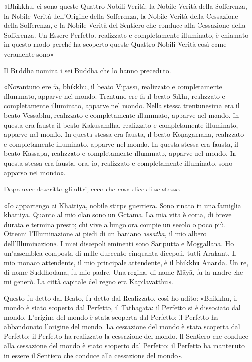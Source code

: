 
«Bhikkhu, ci sono queste Quattro Nobili Verità: la Nobile Verità della
Sofferenza, la Nobile Verità dell’Origine della Sofferenza, la Nobile Verità
della Cessazione della Sofferenza, e la Nobile Verità del Sentiero che conduce
alla Cessazione della Sofferenza. Un Essere Perfetto, realizzato e completamente
illuminato, è chiamato in questo modo perché ha scoperto queste Quattro Nobili
Verità così come veramente sono».


 Il Buddha nomina i sei Buddha che lo hanno preceduto.

 «Novantuno ere fa, bhikkhu, il beato Vipassī, realizzato e
completamente illuminato, apparve nel mondo. Trentuno ere fa il beato Sikhī,
realizzato e completamente illuminato, apparve nel mondo. Nella stessa
trentunesima era il beato Vessabhū, realizzato e completamente illuminato,
apparve nel mondo. In questa era fausta il beato Kakusandha, realizzato e
completamente illuminato, apparve nel mondo. In questa stessa era fausta, il
beato Koṇāgamana, realizzato e completamente illuminato, apparve nel mondo. In
questa stessa era fausta, il beato Kassapa, realizzato e completamente
illuminato, apparve nel mondo. In questa stessa era fausta, ora, io, realizzato
e completamente illuminato, sono apparso nel mondo».


 Dopo aver descritto gli altri, ecco che cosa dice di
se stesso.

 «Io appartengo ai Khattiya, nobile stirpe guerriera. Sono
rinato in una famiglia khattiya. Quanto al mio clan sono un Gotama. La mia vita
è corta, di breve durata e termina presto; chi vive a lungo ora compie un secolo
o poco più. Ottenni l’Illuminazione ai piedi di un baniano \emph{assatha}, il
mio albero dell’Illuminazione. I miei discepoli eminenti sono Sāriputta e
Moggallāna. Ho un’assemblea composta di mille duecento cinquanta dicepoli, tutti
Arahant. Il mio monaco attendente, il mio principale attendente, è il bhikkhu
Ānanda. Un re, di nome Suddhodana, fu mio padre. Una regina, di nome Māyā, fu la
madre che mi generò. La città capitale del regno era Kapilavatthu».


Questo fu detto dal Beato, fu detto dal Realizzato, così ho udito: «Bhikkhu, il
mondo è stato scoperto dal Perfetto, il Tathāgata: il Perfetto si è dissociato
dal mondo. L’origine del mondo è stata scoperta dal Perfetto: il Perfetto ha
abbandonato l’origine del mondo. La cessazione del mondo è stata scoperta dal
Perfetto: il Perfetto ha realizzato la cessazione del mondo. Il Sentiero che
conduce alla cessazione del mondo è stato scoperto dal Perfetto: il Perfetto ha
mantenuto in essere il Sentiero che conduce alla cessazione del mondo».

